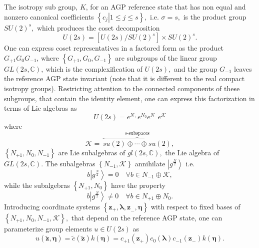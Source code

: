 \documentclass[aps,preprint]{revtex4}%
\begin{document}
The isotropy sub group, $K$, for an AGP reference state that has non equal and
nonzero canonical coefficients $\left\{  \left.  c_{j}\right\vert 1\leq j\leq
s\right\}  ,$ i.e. $\sigma=s,$ is the product group $SU\left(  2\right)
^{s},$ which produces the coset decomposition
\begin{equation}
U\left(  2s\right)  =\left[  U\left(  2s\right)  /SU\left(  2\right)
^{s}\right]  \times SU\left(  2\right)  ^{s}.
\end{equation}
One can express coset representatives in a factored form as the product
$G_{+1}G_{0}G_{-1}$, \cite{Gilmore} where $\left\{  G_{+1},G_{0}%
,G_{-1}\right\}  $ are subgroups of the linear group $GL\left(  2s,\mathbb{C}%
\right)  ,\ $which is the complexification of $U\left(  2s\right)  ,$ and the
group $G_{-1}$ leaves the reference AGP state invariant (note that it is
different to the real compact isotropy groups). Restricting attention to the
connected components of these subgroups, that contain the identity element,
one can express this factorization in terms of Lie algebras as
\begin{equation}
U\left(  2s\right)  =e^{N_{+}}e^{N_{0}}e^{N_{-}}e^{\mathcal{K}}%
\end{equation}
where
\begin{equation}
\mathcal{K}=\,\overset{s\text{-subspaces}}{\overbrace{su\left(  2\right)
\oplus\cdots\oplus su\left(  2\right)  }},
\end{equation}
$\left\{  N_{+1},N_{0},N_{-1}\right\}  $ are Lie subalgebras of $gl\left(
2s,\mathbb{C}\right)  ,$ the Lie algebra of $GL\left(  2s,\mathbb{C}\right)
$. The subalgebras $\left\{  N_{-1},\mathcal{K}\right\}  $ annihilate
$\left\vert g^{\frac{N}{2}}\right\rangle $ i.e.
\begin{equation}
b\left\vert g^{\frac{N}{2}}\right\rangle =0\quad\forall b\in N_{-1}%
\oplus\mathcal{K},
\end{equation}
while the subalgebras $\left\{  N_{+1},N_{0}\right\}  $ have the property
\begin{equation}
b\left\vert g^{\frac{N}{2}}\right\rangle \neq0\quad\forall b\in N_{+1}\oplus
N_{0}.
\end{equation}
Introducing coordinate systems $\left\{  \mathbf{z}_{+},\mathbf{\lambda,z}%
_{-},\mathbf{\eta}\right\}  $ with respect to fixed bases of $\left\{
N_{+1},N_{0},N_{-1},\mathcal{K}\right\}  ,$ that depend on the reference AGP
state, one can parameterize group elements $u\in U\left(  2s\right)  $ as
\begin{equation}
u\left(  \mathbf{\tilde{z},\eta}\right)  =\tilde{c}\left(  \mathbf{\tilde{z}%
}\right)  k\left(  \mathbf{\eta}\right)  =c_{+1}\left(  \mathbf{z}_{+}\right)
c_{0}\left(  \mathbf{\lambda}\right)  c_{-1}\left(  \mathbf{z}_{-}\right)
k\left(  \mathbf{\eta}\right)  .
\end{equation}
\end{document}
